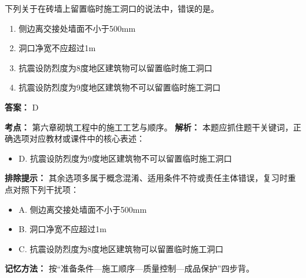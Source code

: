 \documentclass[UTF8,fontset=fandol,11pt]{ctexart}
\begin{document}
\vspace{0.2em}

\begin{quizbox}[title={第 18 题}]
下列关于在砖墙上留置临时施工洞口的说法中，错误的是。\\
\begin{enumerate}[label=\Alph*.]
\item 侧边离交接处墙面不小于500mm
\item 洞口净宽不应超过1m
\item 抗震设防烈度为8度地区建筑物可以留置临时施工洞口
\item 抗震设防烈度为9度地区建筑物不可以留置临时施工洞口
\end{enumerate}
\textbf{答案：} D
\vspace{0.25em}
\begin{answerbox}[title={考点解析}]
\textbf{考点：} 第六章砌筑工程中的施工工艺与顺序。
\textbf{解析：} 本题应抓住题干关键词，正确选项对应教材或课件中的核心表述：
\begin{itemize}
\item D. 抗震设防烈度为9度地区建筑物不可以留置临时施工洞口
\end{itemize}
\textbf{排除提示：} 其余选项多属于概念混淆、适用条件不符或责任主体错误，复习时重点对照下列干扰项：
\begin{itemize}
\item A. 侧边离交接处墙面不小于500mm
\item B. 洞口净宽不应超过1m
\item C. 抗震设防烈度为8度地区建筑物可以留置临时施工洞口
\end{itemize}
\textbf{记忆方法：} 按“准备条件—施工顺序—质量控制—成品保护”四步背。
\end{answerbox}
\end{quizbox}

\vspace{0.2em}
\end{document}
